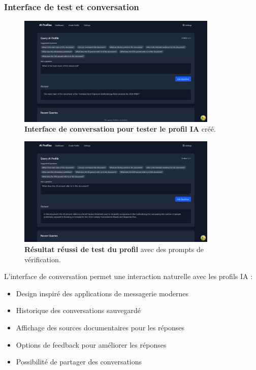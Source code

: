 \subsubsection{Interface de test et conversation}

\begin{figure}[H]
  \centering
  \includegraphics[width=0.85\textwidth,keepaspectratio]{pfe-pics/ai-profile-creation/chat_interface_to_test_the_profile.png}
  \caption{\textbf{Interface de conversation pour tester le profil IA} créé.}
  \label{fig:profile_testing}
\end{figure}

\begin{figure}[H]
  \centering
  \includegraphics[width=0.85\textwidth,keepaspectratio]{pfe-pics/ai-profile-creation/chat_interface_for_testing_profile_2_test_prompt_succes.png}
  \caption{\textbf{Résultat réussi de test du profil} avec des prompts de vérification.}
  \label{fig:profile_test_success}
\end{figure}

L'interface de conversation permet une interaction naturelle avec les profils IA :

\begin{itemize}
  \item Design inspiré des applications de messagerie modernes
  \item Historique des conversations sauvegardé
  \item Affichage des sources documentaires pour les réponses
  \item Options de feedback pour améliorer les réponses
  \item Possibilité de partager des conversations
\end{itemize}

